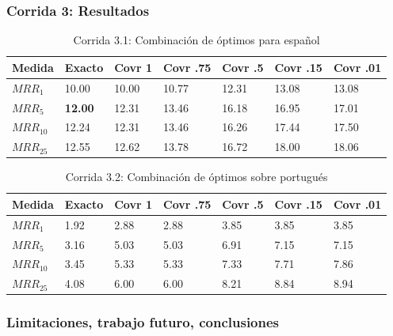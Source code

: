 \begin{frame}
\frametitle{Corrida 3: Resultados}


\begin{table}
\centering
\begin{center}
\begin{tabular}{|l | l | l | l | l | l | l |}
\hline
Medida & Exacto & Covr 1 & Covr .75 & Covr .5 & Covr .15 & Covr .01 \\ \hline
$MRR_{1}$ & 10.00 & 10.00 & 10.77 & 12.31 & 13.08 & 13.08  \\ \hline
$MRR_{5}$ & \textbf{12.00} & 12.31 & 13.46 & 16.18 & 16.95 & 17.01  \\ \hline
$MRR_{10}$ & 12.24 & 12.31 & 13.46 & 16.26 & 17.44 & 17.50  \\ \hline
$MRR_{25}$ & 12.55 & 12.62 & 13.78 & 16.72 & 18.00 & 18.06  \\ \hline
\end{tabular}
\medskip
\caption{Corrida 3.1: Combinación de óptimos para español}
\label{table:optimos}
\end{center}
\end{table}

\begin{table}
\centering
\begin{center}
\begin{tabular}{|l | l | l | l | l | l | l |}
\hline
Medida & Exacto & Covr 1 & Covr .75 & Covr .5 & Covr .15 & Covr .01 \\ \hline
$MRR_{1}$ & 1.92 & 2.88 & 2.88 & 3.85 & 3.85 & 3.85  \\ \hline
$MRR_{5}$ & 3.16 & 5.03 & 5.03 & 6.91 & 7.15 & 7.15  \\ \hline
$MRR_{10}$ & 3.45 & 5.33 & 5.33 & 7.33 & 7.71 & 7.86  \\ \hline
$MRR_{25}$ & 4.08 & 6.00 & 6.00 & 8.21 & 8.84 & 8.94  \\ \hline
\end{tabular}
\caption{Corrida 3.2: Combinación de óptimos sobre portugués}
\label{table:2_3_2_40_getExactMRRWikiFactoid_getCovrMRRWikiFactoid}
\end{center}
\end{table}

\end{frame}



\subsubsection*{Limitaciones, trabajo futuro, conclusiones}

